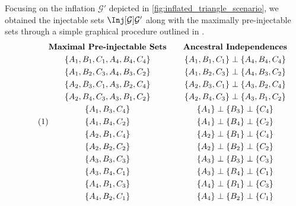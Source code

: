 \documentclass[aps, 10pt, english, twoside, pra, nofootinbib, longbibliography]{revtex4-1}
\theoremstyle{plain}
\theoremstyle{definition}
\theoremstyle{remark}
\newcommand{\graph}{\mathcal{G}}
\newcommand{\ancestralindep}{\perp}
\newcommand{\ts}{{\graph}}
\begin{document}
    Focusing on the inflation $\ts'$ depicted in \cref{fig:inflated_triangle_scenario}, we obtained the injectable sets $\Inj[\ts]{\ts'}$ along with the maximally pre-injectable sets through a simple graphical procedure outlined in \cite{Inflation}.
    \begin{equation*}
        \eq \label{eq:pre-injectable_triangle_scenario}
        \begin{gathered}
            \textbf{Maximal Pre-injectable Sets} \\
            \bc{A_1, B_1, C_1, A_4, B_4, C_4} \\
            \bc{A_1, B_2, C_3, A_4, B_3, C_2} \\
            \bc{A_2, B_3, C_1, A_3, B_2, C_4} \\
            \bc{A_2, B_4, C_3, A_3, B_1, C_2} \\
            \bc{A_1, B_3, C_4} \\
            \bc{A_1, B_4, C_2} \\
            \bc{A_2, B_1, C_4} \\
            \bc{A_2, B_2, C_2} \\
            \bc{A_3, B_3, C_3} \\
            \bc{A_3, B_4, C_1} \\
            \bc{A_4, B_1, C_3} \\
            \bc{A_4, B_2, C_1}
        \end{gathered}
        \qquad
        \begin{gathered}
            \textbf{Ancestral Independences} \\
            \bc{A_1, B_1, C_1} \ancestralindep \bc{A_4, B_4, C_4} \\
            \bc{A_1, B_2, C_3} \ancestralindep \bc{A_4, B_3, C_2} \\
            \bc{A_2, B_3, C_1} \ancestralindep \bc{A_3, B_2, C_4} \\
            \bc{A_2, B_4, C_3} \ancestralindep \bc{A_3, B_1, C_2} \\
            \bc{A_1} \ancestralindep \bc{B_3} \ancestralindep \bc{C_4} \\
            \bc{A_1} \ancestralindep \bc{B_4} \ancestralindep \bc{C_2} \\
            \bc{A_2} \ancestralindep \bc{B_1} \ancestralindep \bc{C_4} \\
            \bc{A_2} \ancestralindep \bc{B_2} \ancestralindep \bc{C_2} \\
            \bc{A_3} \ancestralindep \bc{B_3} \ancestralindep \bc{C_3} \\
            \bc{A_3} \ancestralindep \bc{B_4} \ancestralindep \bc{C_1} \\
            \bc{A_4} \ancestralindep \bc{B_1} \ancestralindep \bc{C_3} \\
            \bc{A_4} \ancestralindep \bc{B_2} \ancestralindep \bc{C_1}
        \end{gathered}
    \end{equation*}
\end{document}
